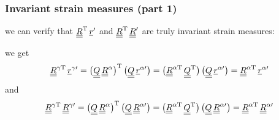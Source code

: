 \begin{frame}
  \frametitle{Invariant strain measures (part 1)}
  
  
  we can verify that $\underline{\underline{R}}^{\mathrm{T}} \, \underline{r}^{\prime}$ and $\underline{\underline{R}}^{\mathrm{T}} \, \underline{\underline{R}}^{\prime}$ are truly invariant strain measures:
  
  \vspace{1em}
  we get
  \begin{displaymath}
    \underline{\underline{R}}^{\gamma \mathrm{T}} \, \underline{r}^{\gamma \prime} =
    \bigl( \underline{\underline{Q}} \, \underline{\underline{R}}^{\alpha} \bigr)^{\mathrm{T}} \, \bigl( \underline{\underline{Q}} \, \underline{r}^{\alpha \prime} \bigr) =
    \bigl( \underline{\underline{R}}^{\alpha \mathrm{T}} \, \underline{\underline{Q}}^{\mathrm{T}} \bigr) \, \bigl( \underline{\underline{Q}} \, \underline{r}^{\alpha \prime} \bigr) =
    \underline{\underline{R}}^{\alpha \mathrm{T}} \, \underline{r}^{\alpha \prime}
  \end{displaymath}
  and
  \begin{displaymath}
    \underline{\underline{R}}^{\gamma \mathrm{T}} \, \underline{\underline{R}}^{\gamma \prime} =
    \bigl( \underline{\underline{Q}} \, \underline{\underline{R}}^{\alpha} \bigr)^{\mathrm{T}} \, \bigl( \underline{\underline{Q}} \, \underline{\underline{R}}^{\alpha \prime} \bigr) =
    \bigl( \underline{\underline{R}}^{\alpha \mathrm{T}} \, \underline{\underline{Q}}^{\mathrm{T}} \bigr) \, \bigl( \underline{\underline{Q}} \, \underline{\underline{R}}^{\alpha \prime} \bigr) =
    \underline{\underline{R}}^{\alpha \mathrm{T}} \, \underline{\underline{R}}^{\alpha \prime}
  \end{displaymath}
\end{frame}


